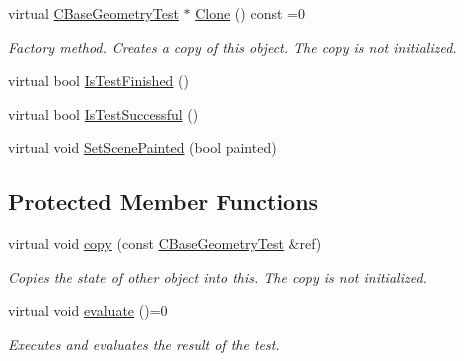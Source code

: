 \begin{DoxyCompactItemize}
virtual \mbox{\hyperlink{class_unit_test_1_1_c_base_geometry_test}{C\+Base\+Geometry\+Test}} $\ast$ \mbox{\hyperlink{class_unit_test_1_1_c_base_geometry_test_a8842760fc0c3523c870c27cf4da991d3}{Clone}} () const =0
\begin{DoxyCompactList}\small\item\em Factory method. Creates a copy of this object. The copy is not initialized. \end{DoxyCompactList}\item 
virtual bool \mbox{\hyperlink{class_unit_test_1_1_c_base_geometry_test_a83d1fcc53bda24eca6933acf5bd3162c}{Is\+Test\+Finished}} ()
\item 
virtual bool \mbox{\hyperlink{class_unit_test_1_1_c_base_geometry_test_aa824a0d8affc72e8bc68616dc38f0961}{Is\+Test\+Successful}} ()
\item 
virtual void \mbox{\hyperlink{class_unit_test_1_1_c_base_geometry_test_a394a19d424a416ade87e4d09978337bf}{Set\+Scene\+Painted}} (bool painted)
\end{DoxyCompactItemize}
\subsection*{Protected Member Functions}
\begin{DoxyCompactItemize}
\item 
\mbox{\label{class_unit_test_1_1_c_base_geometry_test_aac5859499b4a35b9be7fa76d7b09eecc}} 
virtual void \mbox{\hyperlink{class_unit_test_1_1_c_base_geometry_test_aac5859499b4a35b9be7fa76d7b09eecc}{copy}} (const \mbox{\hyperlink{class_unit_test_1_1_c_base_geometry_test}{C\+Base\+Geometry\+Test}} \&ref)
\begin{DoxyCompactList}\small\item\em Copies the state of other object into this. The copy is not initialized. \end{DoxyCompactList}\item 
\mbox{\label{class_unit_test_1_1_c_base_geometry_test_aa8b1294602af974787093218f1c00fa0}} 
virtual void \mbox{\hyperlink{class_unit_test_1_1_c_base_geometry_test_aa8b1294602af974787093218f1c00fa0}{evaluate}} ()=0
\begin{DoxyCompactList}\small\item\em Executes and evaluates the result of the test. \end{DoxyCompactList}\end{DoxyCompactItemize}
